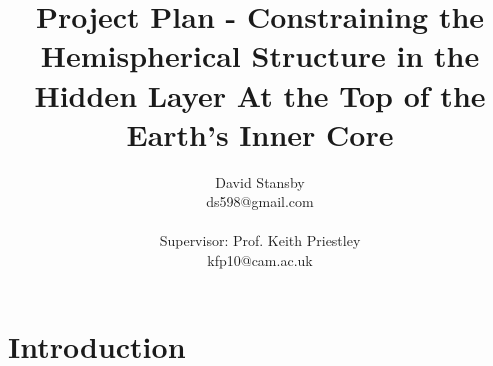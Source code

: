 \documentclass[11pt,a4paper]{article}
\begin{document}
\title{Project Plan - Constraining the Hemispherical Structure in the Hidden Layer At the Top of the Earth's Inner Core}
\author{David Stansby \\ ds598@gmail.com \\  \\ Supervisor: Prof. Keith Priestley \\ kfp10@cam.ac.uk }
\maketitle

\begin{abstract}
\end{abstract}

\section{Introduction}



\end{document}

